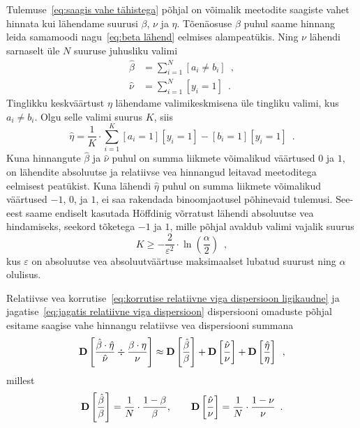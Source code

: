 Tulemuse~\eqref{eq:saagis vahe tähistega} põhjal on võimalik meetodite saagiste vahet hinnata kui lähendame suurusi $\beta$, $\nu$ ja $\eta$. Tõenäosuse $\beta$ puhul saame hinnang leida samamoodi nagu~\eqref{eq:beta lähend} eelmises alampeatükis. Ning $\nu$ lähendi sarnaselt üle $N$ suuruse juhusliku valimi
\begin{align*}
    \hat{\beta} &= \sum_{i = 1}^N [a_i \neq b_i] \enspace, \\
    \hat{\nu} &= \sum_{i = 1}^N [y_i = 1] \enspace.
\end{align*}
Tinglikku keskväärtust $\eta$ lähendame valimikeskmisena üle tingliku valimi, kus $a_i \neq b_i$. Olgu selle valimi suurus $K$, siis
\begin{equation*}
    \hat{\eta} = \frac{1}{K} \cdot \sum_{i = 1}^K [a_i = 1] [y_i = 1] - [b_i = 1] [y_i = 1] \enspace.
\end{equation*}
Kuna hinnangute $\hat{\beta}$ ja $\hat{\nu}$ puhul on summa liikmete võimalikud väärtused $0$ ja $1$, on lähendite absoluutse ja relatiivse vea hinnangud leitavad meetoditega eelmisest peatükist. Kuna lähendi $\hat{\eta}$ puhul on summa liikmete võimalikud väärtused $-1$, $0$, ja $1$, ei saa rakendada binoomjaotusel põhinevaid tulemusi. See-eest saame endiselt kasutada Höffdinig võrratust lähendi absoluutse vea hindamiseks, seekord tõketega $-1$ ja $1$, mille põhjal avaldub valimi vajalik suurus
\begin{equation*}
    K \geq - \frac{2}{\varepsilon^2} \cdot \ln{\left( \frac{\alpha}{2} \right)} \enspace,
\end{equation*}
kus $\varepsilon$ on absoluutse vea absoluutväärtuse maksimaalset lubatud suurust ning $\alpha$ olulisus.

Relatiivse vea korrutise~\eqref{eq:korrutise relatiivne viga dispersioon ligikaudne} ja jagatise~\eqref{eq:jagatis relatiivne viga dispersioon} dispersiooni omaduste põhjal esitame saagise vahe hinnangu relatiivse vea dispersiooni summana
\begin{equation*}
    \operatorname*{\mathbf{D}}\left[\frac{\hat{\beta} \cdot \hat{\eta}}{\hat{\nu}} \div \frac{\beta \cdot \eta}{\nu}\right] \approx \operatorname*{\mathbf{D}}\left[\frac{\hat{\beta}}{\beta}\right] + \operatorname*{\mathbf{D}}\left[\frac{\hat{\nu}}{\nu}\right] + \operatorname*{\mathbf{D}}\left[\frac{\hat{\eta}}{\eta}\right] \enspace,
\end{equation*}
millest
\begin{equation*}
    \operatorname*{\mathbf{D}}\left[\frac{\hat{\beta}}{\beta}\right] = \frac{1}{N} \cdot \frac{1 - \beta}{\beta}, \qquad \operatorname*{\mathbf{D}}\left[\frac{\hat{\nu}}{\nu}\right] = \frac{1}{N} \cdot \frac{1 - \nu}{\nu} \enspace. \\
\end{equation*}

